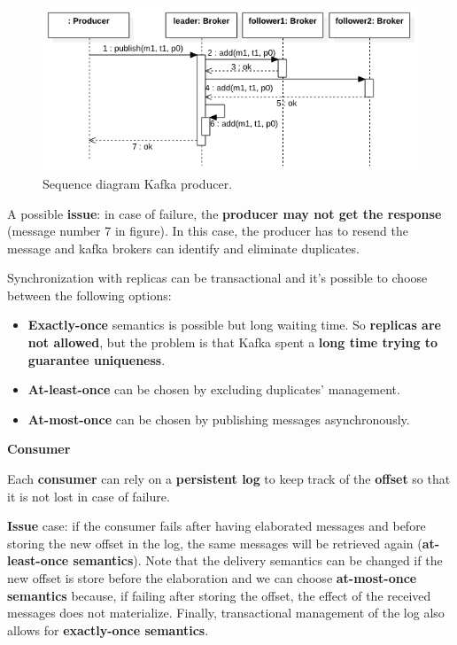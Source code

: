 \begin{figure}[!htp]
    \centering
    \includegraphics[width=\textwidth]{img/kafka-producer.png}
    \caption{Sequence diagram Kafka producer.}
\end{figure}

\noindent
A possible \textbf{issue}: in case of failure, the \textbf{producer may not get the response} (message number 7 in figure). In this case, the producer has to resend the message and kafka brokers can identify and eliminate duplicates.

\highspace
Synchronization with replicas can be transactional and it's possible to choose between the following options:
\begin{itemize}
    \item \textbf{Exactly-once} semantics is possible but long waiting time. So \textbf{replicas are not allowed}, but the problem is that Kafka spent a \textbf{long time trying to guarantee uniqueness}.

    \item \textbf{At-least-once} can be chosen by excluding duplicates' management.

    \item \textbf{At-most-once} can be chosen by publishing messages asynchronously.
\end{itemize}

\begin{flushleft}
    \textcolor{Red2}{\textbf{Consumer}}
\end{flushleft}
Each \textbf{consumer} can rely on a \textbf{persistent log} to keep track of the \textbf{offset} so that it is not lost in case of failure.

\highspace
\textbf{Issue} case: if the consumer fails after having elaborated messages and before storing the new offset in the log, the same messages will be retrieved again (\textbf{at-least-once semantics}). Note that the delivery semantics can be changed if the new offset is store before the elaboration and we can choose \textbf{at-most-once semantics} because, if failing after storing the offset, the effect of the received messages does not materialize. Finally, transactional management of the log also allows for \textbf{exactly-once semantics}.

